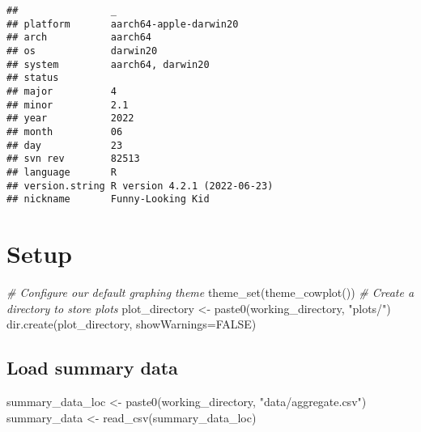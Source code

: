 \documentclass[
]{book}
\newenvironment{Shaded}{\begin{snugshade}}{\end{snugshade}}
\newcommand{\AttributeTok}[1]{\textcolor[rgb]{0.77,0.63,0.00}{#1}}
\newcommand{\CommentTok}[1]{\textcolor[rgb]{0.56,0.35,0.01}{\textit{#1}}}
\newcommand{\ConstantTok}[1]{\textcolor[rgb]{0.00,0.00,0.00}{#1}}
\newcommand{\FunctionTok}[1]{\textcolor[rgb]{0.00,0.00,0.00}{#1}}
\newcommand{\NormalTok}[1]{#1}
\newcommand{\OtherTok}[1]{\textcolor[rgb]{0.56,0.35,0.01}{#1}}
\newcommand{\StringTok}[1]{\textcolor[rgb]{0.31,0.60,0.02}{#1}}
\begin{document}
\begin{verbatim}
##                _                           
## platform       aarch64-apple-darwin20      
## arch           aarch64                     
## os             darwin20                    
## system         aarch64, darwin20           
## status                                     
## major          4                           
## minor          2.1                         
## year           2022                        
## month          06                          
## day            23                          
## svn rev        82513                       
## language       R                           
## version.string R version 4.2.1 (2022-06-23)
## nickname       Funny-Looking Kid
\end{verbatim}

\hypertarget{setup-1}{%
\section{Setup}\label{setup-1}}

\begin{Shaded}
\begin{Highlighting}[]
\CommentTok{\# Configure our default graphing theme}
\FunctionTok{theme\_set}\NormalTok{(}\FunctionTok{theme\_cowplot}\NormalTok{())}
\CommentTok{\# Create a directory to store plots}
\NormalTok{plot\_directory }\OtherTok{\textless{}{-}} \FunctionTok{paste0}\NormalTok{(working\_directory, }\StringTok{"plots/"}\NormalTok{)}
\FunctionTok{dir.create}\NormalTok{(plot\_directory, }\AttributeTok{showWarnings=}\ConstantTok{FALSE}\NormalTok{)}
\end{Highlighting}
\end{Shaded}

\hypertarget{load-summary-data}{%
\subsection{Load summary data}\label{load-summary-data}}

\begin{Shaded}
\begin{Highlighting}[]
\NormalTok{summary\_data\_loc }\OtherTok{\textless{}{-}} \FunctionTok{paste0}\NormalTok{(working\_directory, }\StringTok{"data/aggregate.csv"}\NormalTok{)}
\NormalTok{summary\_data }\OtherTok{\textless{}{-}} \FunctionTok{read\_csv}\NormalTok{(summary\_data\_loc)}
\end{Highlighting}
\end{Shaded}
\end{document}
